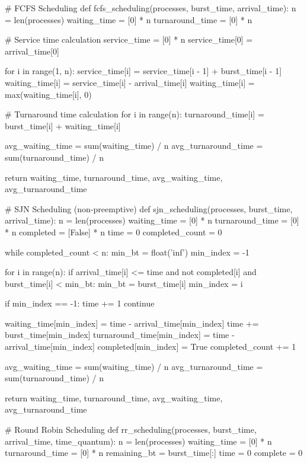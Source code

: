 \documentclass[12pt]{article}
\begin{document}
\begin{python}
    
# FCFS Scheduling
def fcfs_scheduling(processes, burst_time, arrival_time):
    n = len(processes)
    waiting_time = [0] * n
    turnaround_time = [0] * n
    
    # Service time calculation
    service_time = [0] * n
    service_time[0] = arrival_time[0]
    
    for i in range(1, n):
        service_time[i] = service_time[i - 1] + burst_time[i - 1]
        waiting_time[i] = service_time[i] - arrival_time[i]
        waiting_time[i] = max(waiting_time[i], 0)

    # Turnaround time calculation
    for i in range(n):
        turnaround_time[i] = burst_time[i] + waiting_time[i]

    avg_waiting_time = sum(waiting_time) / n
    avg_turnaround_time = sum(turnaround_time) / n

    return waiting_time, turnaround_time, avg_waiting_time, avg_turnaround_time

# SJN Scheduling (non-preemptive)
def sjn_scheduling(processes, burst_time, arrival_time):
    n = len(processes)
    waiting_time = [0] * n
    turnaround_time = [0] * n
    completed = [False] * n
    time = 0
    completed_count = 0
    
    while completed_count < n:
        min_bt = float('inf')
        min_index = -1
        
        for i in range(n):
            if arrival_time[i] <= time and not completed[i] and burst_time[i] < min_bt:
                min_bt = burst_time[i]
                min_index = i
        
        if min_index == -1:
            time += 1
            continue
        
        waiting_time[min_index] = time - arrival_time[min_index]
        time += burst_time[min_index]
        turnaround_time[min_index] = time - arrival_time[min_index]
        completed[min_index] = True
        completed_count += 1

    avg_waiting_time = sum(waiting_time) / n
    avg_turnaround_time = sum(turnaround_time) / n

    return waiting_time, turnaround_time, avg_waiting_time, avg_turnaround_time

# Round Robin Scheduling
def rr_scheduling(processes, burst_time, arrival_time, time_quantum):
    n = len(processes)
    waiting_time = [0] * n
    turnaround_time = [0] * n
    remaining_bt = burst_time[:]
    time = 0
    complete = 0
    

\end{python}
\end{document}
